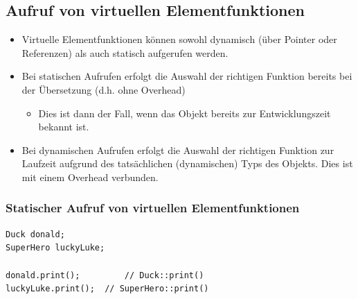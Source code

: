\subsection{Aufruf von virtuellen Elementfunktionen}
\label{sec:aufrufVonVirtuellenElemenfunktionen}
\begin{itemize}
	\item Virtuelle Elementfunktionen können sowohl dynamisch (über Pointer oder Referenzen) als auch statisch aufgerufen werden.
	\item Bei statischen Aufrufen erfolgt die Auswahl der richtigen Funktion bereits bei der Übersetzung (d.h. ohne Overhead)
	\begin{itemize}
		\item Dies ist dann der Fall, wenn das Objekt bereits zur Entwicklungszeit bekannt ist.
	\end{itemize}
	\item Bei dynamischen Aufrufen erfolgt die Auswahl der richtigen Funktion zur Laufzeit aufgrund des tatsächlichen (dynamischen) Typs des Objekts. Dies ist mit einem Overhead verbunden.
\end{itemize}

\subsubsection{Statischer Aufruf von virtuellen Elementfunktionen}
\vspace{-\baselineskip}
\begin{minipage}{0.5\linewidth}
\begin{lstlisting}
Duck donald;
SuperHero luckyLuke;

donald.print();			// Duck::print()
luckyLuke.print();	// SuperHero::print()
\end{lstlisting}
\end{minipage}

